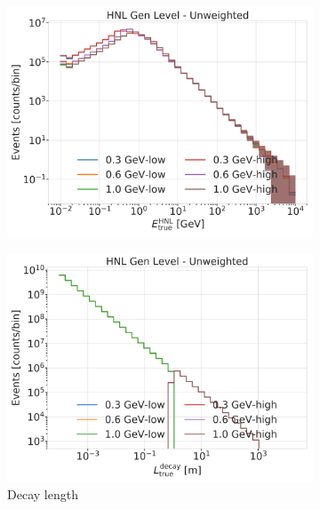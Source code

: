 \begin{figure}[h]
    \centering
    \begin{subfigure}{0.49\linewidth}
        \includegraphics{figures/hnl_simulation/generation/1_d_distr_HNL_true_energy_gen_level_unweighted.png}
    \end{subfigure}
    \begin{subfigure}{0.49\linewidth}
        \includegraphics{figures/hnl_simulation/generation/1_d_distr_distance_gen_level_unweighted.png}
        \caption{Decay length}
    \end{subfigure}
    \begin{subfigure}{0.49\linewidth}

\end{subfigure}
\end{figure}
